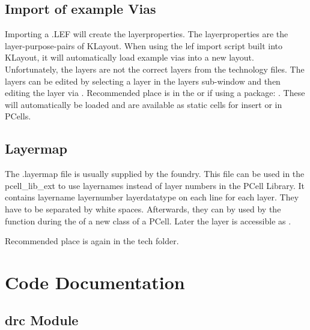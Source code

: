 \documentclass[a4paper,10pt,english]{sphinxmanual}
\begin{document}
\section{Import of example Vias}
\label{\detokenize{photonics/techfile:import-of-example-vias}}
Importing a .LEF will create the layerproperties. The layerproperties are the layer-purpose-pairs of KLayout. When using the lef import script built into
KLayout, it will automatically load example vias into a new layout. Unfortunately, the layers are not the correct layers from the technology files.
The layers can be edited by selecting a layer in the layers sub-window and then editing the layer via .
Recommended place is in the  or if using a package: . These will automatically be loaded and are available as static cells for insert or in PCells.


\section{Layermap}
\label{\detokenize{photonics/techfile:layermap}}
The .layermap file is usually supplied by the foundry. This file can be used in the pcell\_lib\_ext to use layernames instead of layer numbers in the PCell Library.
It contains layername \textbar{} layernumber \textbar{} layerdatatype on each line for each layer. They have to be separated by white spaces. Afterwards, they can by used by the 
function during the  of a new class of a PCell. Later the layer is accessible as .

Recommended place is again in the tech folder.


\chapter{Code Documentation}
\label{\detokenize{modules:code-documentation}}\label{\detokenize{modules::doc}}

\section{drc Module}
\label{\detokenize{drc/drc:drc-module}}\label{\detokenize{drc/drc::doc}}
\end{document}
